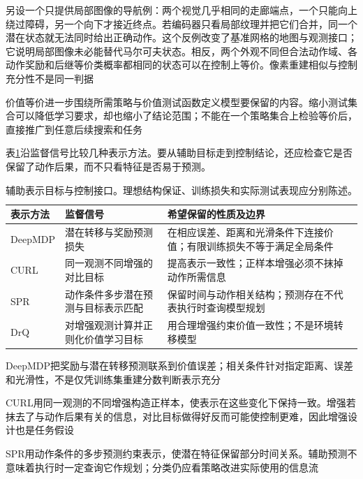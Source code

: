 另设一个只提供局部图像的导航例：两个视觉几乎相同的走廊端点，一个只能向上绕过障碍，另一个向下才接近终点。若编码器只看局部纹理并把它们合并，同一个潜在状态就无法同时给出正确动作。这个反例改变了基准网格的地图与观测接口；它说明局部图像未必能替代马尔可夫状态。相反，两个外观不同但合法动作域、各动作奖励和后继等价类概率都相同的状态可以在控制上等价。像素重建相似与控制充分性不是同一判据

价值等价进一步围绕所需策略与价值测试函数定义模型要保留的内容。缩小测试集合可以降低学习要求，却也缩小了结论范围；不能在一个策略集合上检验等价后，直接推广到任意后续搜索和任务

表\ref{tab:rl-learning-representations}沿监督信号比较几种表示方法。要从辅助目标走到控制结论，还应检查它是否保留了动作后果，而不只看特征是否易于预测。

\begin{table}[t]
  \centering
  \small
  \begin{tabularx}{\linewidth}{>{\raggedright\arraybackslash}p{22mm} >{\raggedright\arraybackslash}X >{\raggedright\arraybackslash}X}
    \toprule
    表示方法 & 监督信号 & 希望保留的性质及边界 \\
    \midrule
    DeepMDP & 潜在转移与奖励预测损失 & 在相应误差、距离和光滑条件下连接价值；有限训练损失不等于满足全局条件 \\
    CURL & 同一观测不同增强的对比目标 & 提高表示一致性；正样本增强必须不抹掉动作所需信息 \\
    SPR & 动作条件多步潜在预测与目标表示匹配 & 保留时间与动作相关结构；预测存在不代表执行时查询模型规划 \\
    DrQ & 对增强观测计算并正则化价值学习目标 & 用合理增强约束价值一致性；不是环境转移模型 \\
    \bottomrule
  \end{tabularx}
  \caption{辅助表示目标与控制接口。理想结构保证、训练损失和实际测试表现应分别陈述。}
  \label{tab:rl-learning-representations}
\end{table}

DeepMDP把奖励与潜在转移预测联系到价值误差；相关条件针对指定距离、误差和光滑性，不是仅凭训练集重建分数判断表示充分

CURL用同一观测的不同增强构造正样本，使表示在这些变化下保持一致。增强若抹去了与动作后果有关的信息，对比目标做得好反而可能使控制更难，因此增强设计也是任务假设

SPR用动作条件的多步预测约束表示，使潜在特征保留部分时间关系。辅助预测不意味着执行时一定查询它作规划；分类仍应看策略改进实际使用的信息流

